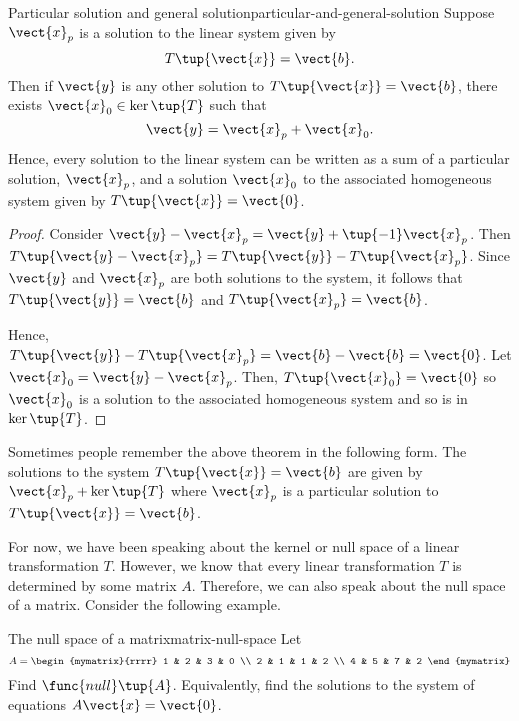 \begin{theorem}{Particular solution and general solution}{particular-and-general-solution}
Suppose $\vect{x}_{p}$ is a solution to the linear system given by
\begin{equation*}
T\tup{\vect{x} } = \vect{b}.
\end{equation*}
Then if $\vect{y}$ is any other solution to $T\tup{\vect{x}}=\vect{b}$, 
 there exists $\vect{x}_0 \in \ker
\tup{T} $ such that
\begin{equation*}
\vect{y} = \vect{x}_{p}+ \vect{x}_0.
\end{equation*}
Hence, every solution to the linear system can be written as a sum of a particular solution, $\vect{x}_p$,
 and a solution $\vect{x}_0$ to the associated 
homogeneous system given by $T\tup{\vect{x}}=\vect{0}$.
\end{theorem}

\begin{proof}
Consider $\vect{y} - \vect{x}_{p}= \vect{y} + \tup{
-1} \vect{x}_{p}$. Then $T\tup{\vect{y} - \vect{x}_{p}} =T\tup{\vect{y}}
-T\tup{\vect{x}_{p} }$. Since $\vect{y}$ and $\vect{x}_{p}$ are both solutions to the system, it follows that $T\tup{\vect{y}}= \vect{b} $
and $T\tup{\vect{x}_p} = \vect{b}$. 

Hence, $T\tup{\vect{y}}-T\tup{\vect{x}_{p} }
=\vect{b} - \vect{b} = \vect{0}$.  Let $\vect{x}_0 = \vect{y} - \vect{x}_{p}$.
Then, $T\tup{\vect{x}_0}= \vect{0} $ so $\vect{x}_0$ is a solution to the associated homogeneous system and so is in $\ker \tup{T}$.
\end{proof}

Sometimes people remember the above theorem in the following form. The
solutions to the system $T\tup{\vect{x}}=\vect{b}$ are given by 
$\vect{x}_{p}+\ker \tup{T} $ where $\vect{x}_{p}$ is a particular
solution to $T\tup{\vect{x}}=\vect{b}$.

For now, we have been speaking about the kernel or null space of a linear transformation $T$. However, 
we know that every linear transformation $T$ is determined by some matrix $A$. Therefore,
we can also speak about the null space of a matrix. Consider the following example.  

\begin{example}{The null space of a matrix}{matrix-null-space}
Let
\begin{equation*}
A=\begin{mymatrix}{rrrr}
1 & 2 & 3 & 0 \\
2 & 1 & 1 & 2 \\
4 & 5 & 7 & 2
\end{mymatrix}
\end{equation*}
Find $\func{null} \tup{A} $. Equivalently, find the solutions to the
system of equations $A\vect{x}=\vect{0}$.
\end{example}

